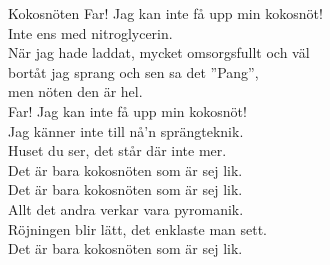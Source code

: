 \begin{song}{Kokosnöten}
    \showversenumber
	Far! Jag kan inte få upp min kokosnöt!\\
	Inte ens med nitroglycerin.\\
	När jag hade laddat, mycket omsorgsfullt och väl\\
	bortåt jag sprang och sen sa det ''Pang'',\\
	men nöten den är hel.\\
	Far! Jag kan inte få upp min kokosnöt!\\
	Jag känner inte till nå'n sprängteknik.\\
	Huset du ser, det står där inte mer.\\
	Det är bara kokosnöten som är sej lik.\\
	Det är bara kokosnöten som är sej lik.\\
	Allt det andra verkar vara pyromanik.\\
	Röjningen blir lätt, det enklaste man sett.\\
	Det är bara kokosnöten som är sej lik.
	
\end{song}
